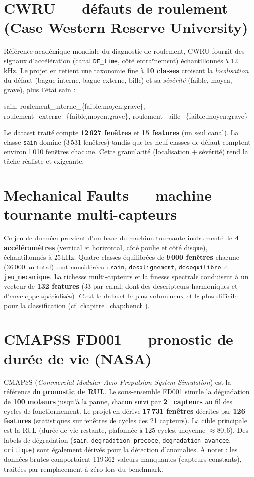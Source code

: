 \section{CWRU --- défauts de roulement (Case Western Reserve University)}
Référence académique mondiale du diagnostic de roulement, CWRU fournit des signaux
d'accélération (canal \texttt{DE\_time}, côté entraînement) échantillonnés à 12\,kHz. Le
projet en retient une taxonomie fine à \textbf{10 classes} croisant la \emph{localisation}
du défaut (bague interne, bague externe, bille) et sa \emph{sévérité} (faible, moyen,
grave), plus l'état sain :
\begin{center}\small\ttfamily
sain, roulement\_interne\_\{faible,moyen,grave\}, roulement\_externe\_\{faible,moyen,grave\},
roulement\_bille\_\{faible,moyen,grave\}
\end{center}
Le dataset traité compte \textbf{12\,627 fenêtres} et \textbf{15 features} (un seul canal).
La classe \texttt{sain} domine (3\,531 fenêtres) tandis que les neuf classes de défaut
comptent environ 1\,010 fenêtres chacune. Cette granularité (localisation + sévérité)
rend la tâche réaliste et exigeante.

\section{Mechanical Faults --- machine tournante multi-capteurs}
Ce jeu de données provient d'un banc de machine tournante instrumenté de \textbf{4
accéléromètres} (vertical et horizontal, côté poulie et côté disque), échantillonnés à
25\,kHz. Quatre classes équilibrées de \textbf{9\,000 fenêtres} chacune (36\,000 au total)
sont considérées : \texttt{sain}, \texttt{desalignement}, \texttt{desequilibre} et
\texttt{jeu\_mecanique}. La richesse multi-capteurs et la finesse spectrale conduisent à un
vecteur de \textbf{132 features} (33 par canal, dont des descripteurs harmoniques et
d'enveloppe spécialisés). C'est le dataset le plus volumineux et le plus difficile pour la
classification (cf. chapitre~\ref{chap:bench}).

\section{CMAPSS FD001 --- pronostic de durée de vie (NASA)}
CMAPSS (\emph{Commercial Modular Aero-Propulsion System Simulation}) est la référence du
\textbf{pronostic de RUL}. Le sous-ensemble FD001 simule la dégradation de \textbf{100
moteurs} jusqu'à la panne, chacun suivi par \textbf{21 capteurs} au fil des cycles de
fonctionnement. Le projet en dérive \textbf{17\,731 fenêtres} décrites par \textbf{126
features} (statistiques sur fenêtres de cycles des 21 capteurs). La cible principale est la
RUL (durée de vie restante, plafonnée à 125 cycles, moyenne $\approx 80{,}6$). Des labels de
dégradation (\texttt{sain}, \texttt{degradation\_precoce}, \texttt{degradation\_avancee},
\texttt{critique}) sont également dérivés pour la détection d'anomalies. À noter : les
données brutes comportaient 119\,362 valeurs manquantes (capteurs constants), traitées par
remplacement à zéro lors du benchmark.

